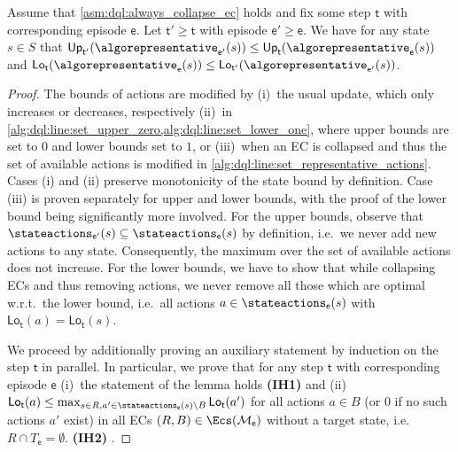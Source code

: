 \documentclass{theoretics}
\makeatletter
\newcommand{\intersectionSym}{\cap}
\newcommand{\intersectionBin}{\mathbin{\intersectionSym}}
\newcommand{\intersection}{\intersectionBin}
\newcommand{\MDP}{\mathcal{M}}
\newcommand{\States}{S}
\newcommand{\upperbound}{\mathsf{Up}}
\newcommand{\lowerbound}{\mathsf{Lo}}
\newcommand{\targetset}{T}
\newcommand{\algostep}{\mathsf{t}}
\newcommand{\algoepisode}{\mathsf{e}}
\def\alabel#1#2{\begingroup
	\textbf{(#2)}\def\@currentlabel{\textbf{[#2]}}\phantomsection\label{#1}\endgroup
}
\makeatother
\begin{document}
\begin{lemma} \label{stm:dql:bounds_monotone}
	Assume that \cref{asm:dql:always_collapse_ec} holds and fix some step $\algostep$ with corresponding episode $\algoepisode$.
	Let $\algostep' \geq \algostep$ with episode $\algoepisode' \geq \algoepisode$.
	We have for any state $s \in \States$ that $\upperbound_{\algostep'}(\algorepresentative_{\algoepisode'}(s)) \leq \upperbound_{\algostep}(\algorepresentative_\algoepisode(s))$ and $\lowerbound_{\algostep}(\algorepresentative_\algoepisode(s)) \leq \lowerbound_{\algostep'}(\algorepresentative_{\algoepisode'}(s))$.
\end{lemma}

\begin{proof}
	The bounds of actions are modified by (i)~the usual update, which only increases or decreases, respectively (ii)~in \cref{alg:dql:line:set_upper_zero,alg:dql:line:set_lower_one}, where upper bounds are set to $0$ and lower bounds set to $1$, or (iii)~when an EC is collapsed and thus the set of available actions is modified in \cref{alg:dql:line:set_representative_actions}.
	Cases (i) and (ii) preserve monotonicity of the state bound by definition.
	Case (iii) is proven separately for upper and lower bounds, with the proof of the lower bound being significantly more involved.
	For the upper bounds, observe that $\stateactions_{\algoepisode'}(s) \subseteq \stateactions_{\algoepisode}(s)$ by definition, i.e.\ we never add new actions to any state.
	Consequently, the maximum over the set of available actions does not increase.
	For the lower bounds, we have to show that while collapsing ECs and thus removing actions, we never remove all those which are optimal w.r.t.\ the lower bound, i.e.\ all actions $a \in \stateactions_\algoepisode(s)$ with $\lowerbound_\algostep(a) = \lowerbound_\algostep(s)$.

	We proceed by additionally proving an auxiliary statement by induction on the step $\algostep$ in parallel.
	In particular, we prove that for any step $\algostep$ with corresponding episode $\algoepisode$ (i)~the statement of the lemma holds \alabel{proof:dql:lower_bounds_monotone:induction_lemma}{IH1} and (ii)~$\lowerbound_{\algostep}(a) \leq \max_{s \in R, a' \in \stateactions_{\algoepisode}(s) \setminus B} \lowerbound_\algostep(a')$ for all actions $a \in B$ (or $0$ if no such actions $a'$ exist) in all ECs $(R, B) \in \Ecs(\MDP_\algoepisode)$ without a target state, i.e.\ $R \intersection \targetset_\algoepisode = \emptyset$. \alabel{proof:dql:lower_bounds_monotone:induction_aux}{IH2}.


\end{proof}
\end{document}

